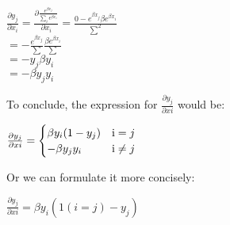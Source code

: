 \documentclass[12pt]{article}
\begin{document}
\begin{center}
    $
     \frac{\partial y_{j}}{\partial x_{i}}=
    \frac{\partial \frac{e^{\beta x_{j}}}{\sum_{i}e^{\beta x_{i}}}}{\partial x_{i}}=
    \frac{0 - e^{\beta x_{j}}\beta e^{\beta x_{i}}}{\sum^2}  
    $\\
    $
    = -\frac{e^{\beta x_{j}}}{\sum}\frac{\beta e^{\beta x_{i}}}{\sum}
    $\\
    $
    = -y_{j}\beta y_{i}
    $\\
    $
    = -\beta y_{j}y_{i}
    $
\end{center}To conclude, the expression for $\frac{\partial y_{j}}{\partial x{i}}$ would be:
\begin{center}
    $
     \frac{\partial y_{j}}{\partial x{i}}=
    \begin{cases}
        \beta y_{i}(1-y_{j}) & \text i = j \\
        -\beta y_{j}y_{i} & \text i \neq j
    \end{cases}
    $
\end{center}Or we can formulate it more concisely:
\begin{center}
    $
    \frac{\partial y_{j}}{\partial x{i}}=
    \beta y_{i}(1(i = j) - y_{j})
    $
\end{center}
\end{document}
